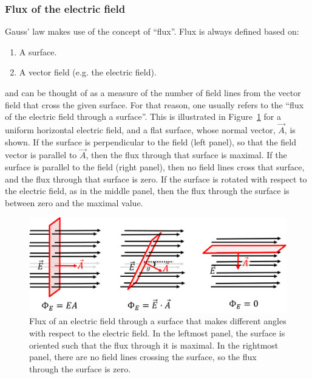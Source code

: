 \subsubsection{Flux of the electric field}\label{sec:gauss:flux}

Gauss' law makes use of the concept of ``flux''. Flux is always defined based on:

\begin{enumerate}
\item A surface.
\item A vector field (e.g. the electric field).
\end{enumerate}

and can be thought of as a measure of the number of field lines from the vector field that cross the given surface. For that reason, one usually refers to the ``flux of the electric field through a surface''. This is illustrated in Figure~\ref{fig:gauss:fluxangle} for a uniform horizontal electric field, and a flat surface, whose normal vector, $\vec A$, is shown. If the surface is perpendicular to the field (left panel), so that the field vector is parallel to $\vec A$, then the flux through that surface is maximal. If the surface is parallel to the field (right panel), then no field lines cross that surface, and the flux through that surface is zero. If the surface is rotated with respect to the electric field, as in the middle panel, then the flux through the surface is between zero and the maximal value.

\begin{figure}[!htbp]
\centering
\includegraphics[width=0.9\linewidth]{files/fluxangle-958ab1f9963cf42848c577cd247fa3d9.png}
\caption[]{Flux of an electric field through a surface that makes different angles with respect to the electric field. In the leftmost panel, the surface is oriented such that the flux through it is maximal. In the rightmost panel, there are no field lines crossing the surface, so the flux through the surface is zero.}
\label{fig:gauss:fluxangle}
\end{figure}

